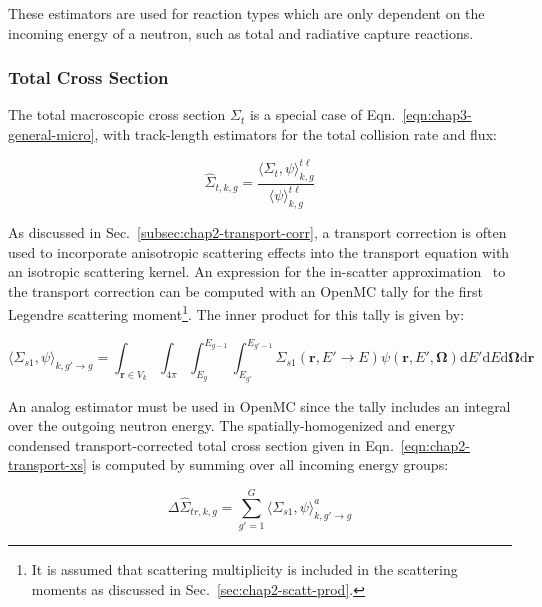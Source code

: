 These estimators are used for reaction types which are only dependent on the incoming energy of a neutron, such as total and radiative capture reactions.


\subsubsection{Total Cross Section}
\label{subsubsec:chap3-tally-types-tot-xs}

The total macroscopic cross section $\Sigma_{t}$ is a special case of Eqn.~\ref{eqn:chap3-general-micro}, with track-length estimators for the total collision rate and flux:

\begin{equation}
\label{eqn:chap3-total-macro}
\hat{\Sigma}_{t,k,g} = \frac{\langle \Sigma_{t}, \psi \rangle_{k,g}^{t\ell}}{\langle \psi \rangle_{k,g}^{t\ell}}
\end{equation}

As discussed in Sec.~\ref{subsec:chap2-transport-corr}, a transport correction is often used to incorporate anisotropic scattering effects into the transport equation with an isotropic scattering kernel. An expression for the in-scatter approximation~\cite{yamamoto2008simplified} to the transport correction can be computed with an OpenMC tally for the first Legendre scattering moment\footnote{It is assumed that scattering multiplicity is included in the scattering moments as discussed in Sec.~\ref{sec:chap2-scatt-prod}.}. The inner product for this tally is given by:

\begin{equation}
\label{eqn:chap3-sigs1}
\langle \Sigma_{s1}, \psi \rangle_{k,g'\rightarrow g} = \int_{\mathbf{r} \in V_{k}} \int_{4\pi} \int_{E_{g}}^{E_{g-1}} \int_{E_{g'}}^{E_{g'-1}} \Sigma_{s1}(\mathbf{r},E'\rightarrow E)\psi(\mathbf{r},E',\mathbf{\Omega}) \mathrm{d}E'\mathrm{d}E\mathrm{d}\mathbf{\Omega}\mathrm{d}\mathbf{r}
\end{equation}

\noindent An analog estimator must be used in OpenMC since the tally includes an integral over the outgoing neutron energy. The spatially-homogenized and energy condensed transport-corrected total cross section given in Eqn.~\ref{eqn:chap2-transport-xs} is computed by summing over all incoming energy groups:

\begin{equation}
\label{eqn:chap3-transport-corr-macro}
\Delta\hat{\Sigma}_{tr,k,g} = \displaystyle\sum\limits_{g'=1}^{G} \langle{\Sigma_{s1}, \psi \rangle_{k,g'\rightarrow g}^{a}}
\end{equation}


